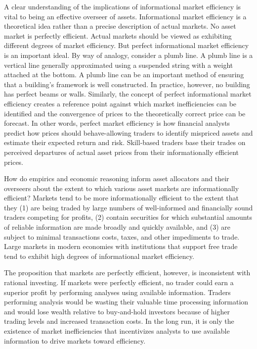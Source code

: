 \documentclass[11pt]{article}
\begin{document}
A clear understanding of the implications of informational market efficiency is vital to being an effective overseer of assets. Informational market efficiency is a theoretical idea rather than a precise description of actual markets. No asset market is perfectly efficient. Actual markets should be viewed as exhibiting different degrees of market efficiency. But perfect informational market efficiency is an important ideal. By way of analogy, consider a plumb line. A plumb line is a vertical line generally approximated using a suspended string with a weight attached at the bottom. A plumb line can be an important method of ensuring that a building's framework is well constructed. In practice, however, no building has perfect beams or walls. Similarly, the concept of perfect informational market efficiency creates a reference point against which market inefficiencies can be identified and the convergence of prices to the theoretically correct price can be forecast. In other words, perfect market efficiency is how financial analysts predict how prices should behave-allowing traders to identify mispriced assets and estimate their expected return and risk. Skill-based traders base their trades on perceived departures of actual asset prices from their informationally efficient prices.

How do empirics and economic reasoning inform asset allocators and their overseers about the extent to which various asset markets are informationally efficient? Markets tend to be more informationally efficient to the extent that they (1) are being traded by large numbers of well-informed and financially sound traders competing for profits, (2) contain securities for which substantial amounts of reliable information are made broadly and quickly available, and (3) are subject to minimal transactions costs, taxes, and other impediments to trade. Large markets in modern economies with institutions that support free trade tend to exhibit high degrees of informational market efficiency.

The proposition that markets are perfectly efficient, however, is inconsistent with rational investing. If markets were perfectly efficient, no trader could earn a superior profit by performing analyses using available information. Traders performing analysis would be wasting their valuable time processing information and would lose wealth relative to buy-and-hold investors because of higher trading levels and increased transaction costs. In the long run, it is only the existence of market inefficiencies that incentivizes analysts to use available information to drive markets toward efficiency.
\end{document}
